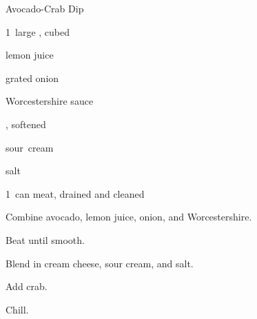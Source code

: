 \begin{recipe}{Avocado-Crab Dip}{}{}

\begin{ingredients}
\item 1~large , cubed
\item {} lemon juice
\item {} grated onion
\item {} Worcestershire sauce
\item {} , softened
\item \C{\quarter} sour~cream
\item \tp{\quarter} salt
\item 1~can  meat, drained and cleaned
\end{ingredients}

\begin{directions}
\item Combine avocado, lemon juice, onion, and Worcestershire.
\item Beat until smooth.
\item Blend in cream cheese, sour cream, and salt.
\item Add crab.
\item Chill.
\end{directions}

\end{recipe}

